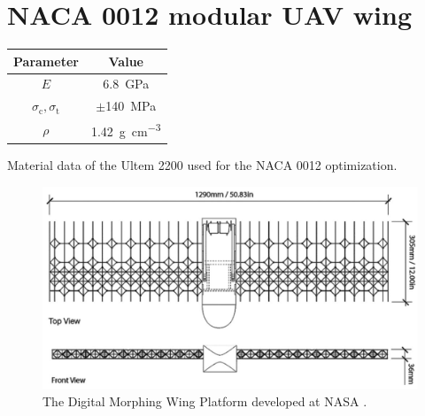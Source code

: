 \section{NACA 0012 modular UAV wing} \label{sec:07_wing}
\begin{margintable}
    \small
    \centering
    \begin{tabular}{cc}
    \toprule
    \textbf{Parameter}        & \textbf{Value} \\ \midrule
    $E$              & \qty{6.8}{GPa}     \\
    $\sigma_\text{c}, \sigma_\text{t}$ & $\pm $\qty{140}{MPa} \\
    $\rho$              & \qty{1.42}{\gram\per\cubic\centi\metre}   \\
    \bottomrule
    \end{tabular}
    \caption{Material data of the Ultem 2200 used for the NACA 0012 optimization.}
    \label{tab:07_NACA_mat}
\end{margintable}
\begin{figure}
    \centering
    \includegraphics[width=0.8\linewidth]{figures/07_aeronautic/naca0012.png}
        \caption{The Digital Morphing Wing Platform developed at NASA \cite{jenett_digital_2017}.}
    \label{fig:07_naca0012}
\end{figure}

